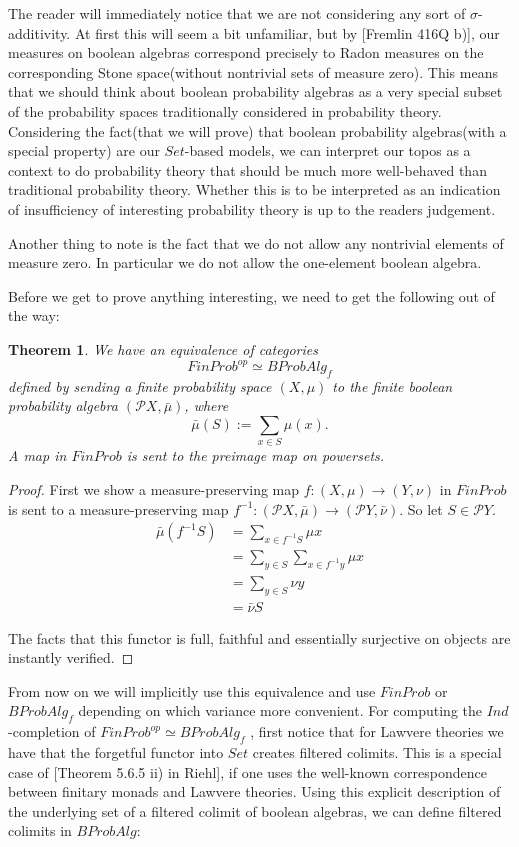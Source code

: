 \documentclass[a4paper,draft]{amsproc}
\theoremstyle{plain}
\newtheorem{theorem}{Theorem}[section]
\theoremstyle{definition}
\theoremstyle{remark}
\numberwithin{equation}{section}
\begin{document}
The reader will immediately notice that we are not considering any sort of $\sigma$-additivity. At first this will seem a bit unfamiliar, but by [Fremlin 416Q b)], our measures on boolean algebras correspond precisely to Radon measures on the corresponding Stone space(without nontrivial sets of measure zero). This means that we should think about boolean probability algebras as a very special subset of the probability spaces traditionally considered in probability theory. Considering the fact(that we will prove) that boolean probability algebras(with a special property) are our $Set$-based models, we can interpret our topos as a context to do probability theory that should be much more well-behaved than traditional probability theory. Whether this is to be interpreted as an indication of insufficiency of interesting probability theory is up to the readers judgement.

Another thing to note is the fact that we do not allow any nontrivial elements of measure zero. In particular we do not allow the one-element boolean algebra.

Before we get to prove anything interesting, we need to get the following out of the way:

\begin{theorem}\label{Imnotdumb} We have an equivalence of categories
\[
FinProb^{op} \simeq BProbAlg_f
\]
defined by sending a finite probability space $(X, \mu)$ to the finite boolean probability algebra $(\mathcal{P} X, \bar{\mu})$, where
\[
\bar{\mu}(S) := \sum_{x \in S} \mu(x).
\]
A map in $FinProb$ is sent to the preimage map on powersets.
\end{theorem}
\begin{proof}
First we show a measure-preserving map $f: (X,\mu) \to (Y,\nu)$ in $FinProb$ is sent to a measure-preserving map $f^{-1}: (\mathcal{P}X, \bar{\mu}) \to (\mathcal{P}Y, \bar{\nu})$. So let $S \in \mathcal{P} Y$.
\begin{align*}
\bar{\mu}(f^{-1} S) &= \sum_{x \in f^{-1} S} \mu x \\
&= \sum_{y \in S} \sum_{x \in f^{-1} y} \mu x \\
&= \sum_{y \in S} \nu y \\
&= \bar{\nu} S
\end{align*}

The facts that this functor is full, faithful and essentially surjective on objects are instantly verified.
\end{proof}

From now on we will implicitly use this equivalence and use $FinProb$ or $BProbAlg_f$ depending on which variance more convenient.
For computing the $Ind$-completion of $FinProb^{op} \simeq BProbAlg_f$ , first notice that for Lawvere theories we have that the forgetful functor into $Set$ creates filtered colimits. This is a special case of [Theorem 5.6.5 ii) in Riehl], if one uses the well-known correspondence between finitary monads and Lawvere theories. Using this explicit description of the underlying set of a filtered colimit of boolean algebras, we can define filtered colimits in $BProbAlg$:
\end{document}
